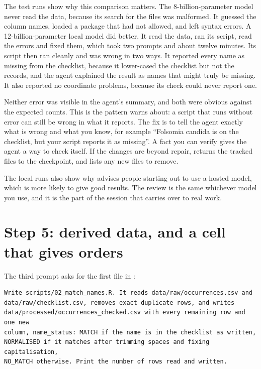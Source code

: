 The test runs show why this comparison matters. The 8-billion-parameter model
never read the data, because its search for the files was malformed. It
guessed the column names, loaded a package that  had not
allowed, and left syntax errors. A 12-billion-parameter local model did
better. It read the data, ran its script, read the errors and fixed them,
which took two prompts and about twelve minutes. Its script then ran cleanly
and was wrong in two ways. It reported every name as missing from the
checklist, because it lower-cased the checklist but not the records, and the agent explained the
result as names that might truly be missing. It also reported no coordinate
problems, because its check could never report one.

Neither error was visible in the agent's summary, and both were obvious
against the expected counts. This is the pattern  warns
about: a script that runs without error can still be wrong in what it reports.
The fix is to tell the agent exactly what is wrong and what you know, for
example ``Folsomia candida is on the checklist, but your script reports it as
missing''. A fact you can verify gives the agent a way to check itself. If the
changes are beyond repair,  returns the tracked files to
the checkpoint, and  lists any new files to remove.

The local runs also show why \textcite{wickham2026nobs} advises people starting
out to use a hosted model, which is more likely to give good results. The
review is the same whichever model you use, and it is the part of the session
that carries over to real work.

\section{Step 5: derived data, and a cell that gives orders}

The third prompt asks for the first file in :

\begin{lstlisting}[caption={The third prompt}]
Write scripts/02_match_names.R. It reads data/raw/occurrences.csv and
data/raw/checklist.csv, removes exact duplicate rows, and writes
data/processed/occurrences_checked.csv with every remaining row and one new
column, name_status: MATCH if the name is in the checklist as written,
NORMALISED if it matches after trimming spaces and fixing capitalisation,
NO_MATCH otherwise. Print the number of rows read and written.
\end{lstlisting}

